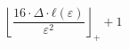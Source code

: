 \[\left\lfloor \frac{16 \cdot \Delta \cdot ℓ\left(\varepsilon\right)}{\varepsilon^{2}} \right\rfloor_{+} + 1\]
